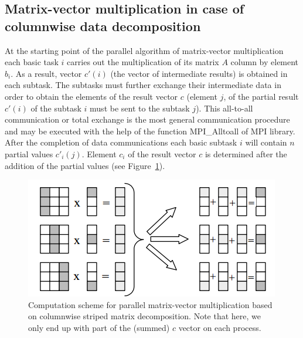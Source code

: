 \subsection{Matrix-vector multiplication in case of columnwise data decomposition} %
\label{sub:matrix_vector_multiplication_in_case_of_columnwise_data_decomposition}
At the starting point of the parallel algorithm of matrix-vector multiplication each basic task $i$ carries out the multiplication of its matrix $A$ column by element $b_i$. As a result, vector $c'(i)$ (the vector of intermediate results) is obtained in each subtask. The subtasks must further exchange their intermediate data in order to obtain the elements of the result vector $c$ (element $j$, of the partial result $c'(i)$ of the subtask $i$ must be sent to the subtask $j$). This all-to-all communication or total exchange is the most general communication procedure and may be executed with the help of the function MPI\_Alltoall of MPI library. After the completion of data communications each basic subtask $i$ will contain $n$ partial values $c'_i(j)$. Element $c_i$ of the result vector $c$ is determined after the addition of the partial values (see Figure~\ref{fig:colwise}).

\begin{figure}[htbp]
  \centering
  \includegraphics[width=.5\textwidth]{illustrations/matrix-vector-product/column.png}
  \caption{Computation scheme for parallel matrix-vector multiplication based on columnwise striped matrix decomposition. Note that here, we only end up with part of the (summed) $c$ vector on each process.}
  \label{fig:colwise}
\end{figure}



